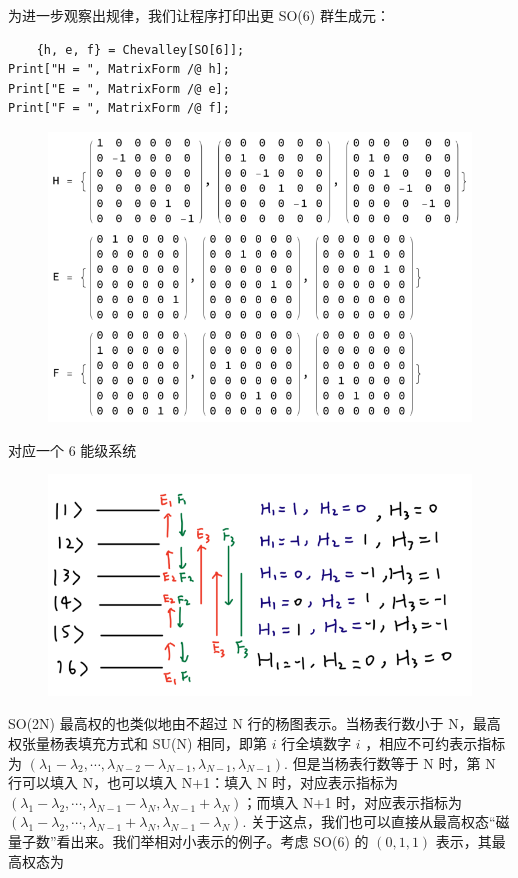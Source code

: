 \documentclass[UTF8]{ctexart}
\begin{document}
\noindent 为进一步观察出规律，我们让程序打印出更 SO(6) 群生成元：

\begin{verbatim}
	{h, e, f} = Chevalley[SO[6]];
Print["H = ", MatrixForm /@ h];
Print["E = ", MatrixForm /@ e];
Print["F = ", MatrixForm /@ f];
\end{verbatim}

\begin{figure}[H]
\begin{centering}
\includegraphics[width=0.7\linewidth]{include/O17}
\par\end{centering}
\end{figure}

\noindent 对应一个 6 能级系统

\begin{figure}[H]
\begin{centering}
\includegraphics[width=0.6\linewidth]{include/P6}
\par\end{centering}
\end{figure}

\noindent SO(2N) 最高权的也类似地由不超过 N 行的杨图表示。当杨表行数小于 N，最高权张量杨表填充方式和 SU(N) 相同，即第  $i$  行全填数字  $i$ ，相应不可约表示指标为 $(\lambda_1 -\lambda_2, \cdots,\lambda_{N-2}-\lambda_{N-1},\lambda_{N-1}, \lambda_{N-1})$. 但是当杨表行数等于 N 时，第 N 行可以填入 N，也可以填入 N+1：填入 N 时，对应表示指标为 $(\lambda_1 - \lambda_2, \cdots, \lambda_{N-1} - \lambda_N,\lambda_{N-1} + \lambda_N )$；而填入 N+1 时，对应表示指标为 $(\lambda_{1} - \lambda_2, \cdots, \lambda_{N-1} + \lambda_N,\lambda_{N-1} - \lambda_N)$. 关于这点，我们也可以直接从最高权态“磁量子数”看出来。我们举相对小表示的例子。考虑 SO(6) 的 $(0,1,1)$ 表示，其最高权态为
\end{document}
